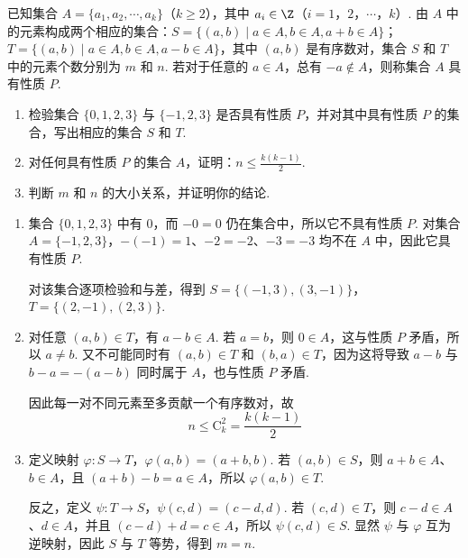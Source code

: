 \begin{problem}
已知集合 \(A = \{a_{1}, a_{2}, \cdots, a_{k}\}\)（\(k \geqslant 2\)），其中 \(a_{i} \in \Z\)（\(i = 1\)，\(2\)，\(\cdots\)，\(k\)）. 由 \(A\) 中的元素构成两个相应的集合：\(S = \{(a, b) \mid a \in A, b \in A, a + b \in A\}\)；\(T = \{(a, b) \mid a \in A, b \in A, a - b \in A\}\)，其中 \((a, b)\) 是有序数对，集合 \(S\) 和 \(T\) 中的元素个数分别为 \(m\) 和 \(n\). 若对于任意的 \(a \in A\)，总有 \(-a \notin A\)，则称集合 \(A\) 具有性质 \(P\).

\begin{enumerate}
\item 检验集合 \(\{0, 1, 2, 3\}\) 与 \(\{-1, 2, 3\}\) 是否具有性质 \(P\)，并对其中具有性质 \(P\) 的集合，写出相应的集合 \(S\) 和 \(T\).
\item 对任何具有性质 \(P\) 的集合 \(A\)，证明：\(n \leqslant \frac{k(k - 1)}{2}\).
\item 判断 \(m\) 和 \(n\) 的大小关系，并证明你的结论.
\end{enumerate}
\end{problem}

\begin{solution}
\begin{enumerate}
\item 集合 \(\{0,1,2,3\}\) 中有 \(0\)，而 \(-0=0\) 仍在集合中，所以它不具有性质 \(P\). 对集合 \(A=\{-1,2,3\}\)，\(-(-1)=1\)、\(-2=-2\)、\(-3=-3\) 均不在 \(A\) 中，因此它具有性质 \(P\).

对该集合逐项检验和与差，得到
\(S=\{(-1,3),(3,-1)\}\)，\(T=\{(2,-1),(2,3)\}\).
\item 对任意 \((a,b)\in T\)，有 \(a-b\in A\). 若 \(a=b\)，则 \(0\in A\)，这与性质 \(P\) 矛盾，所以 \(a\ne b\). 又不可能同时有 \((a,b)\in T\) 和 \((b,a)\in T\)，因为这将导致 \(a-b\) 与 \(b-a=-(a-b)\) 同时属于 \(A\)，也与性质 \(P\) 矛盾.

因此每一对不同元素至多贡献一个有序数对，故
\[
n\leqslant\mathrm C_k^2=\frac{k(k-1)}2
\]
\item 定义映射 \(\varphi:S\to T\)，\(\varphi(a,b)=(a+b,b)\). 若 \((a,b)\in S\)，则 \(a+b\in A\)、\(b\in A\)，且 \((a+b)-b=a\in A\)，所以 \(\varphi(a,b)\in T\).

反之，定义 \(\psi:T\to S\)，\(\psi(c,d)=(c-d,d)\). 若 \((c,d)\in T\)，则 \(c-d\in A\)、\(d\in A\)，并且 \((c-d)+d=c\in A\)，所以 \(\psi(c,d)\in S\). 显然 \(\psi\) 与 \(\varphi\) 互为逆映射，因此 \(S\) 与 \(T\) 等势，得到 \(m=n\).
\end{enumerate}
\end{solution}
